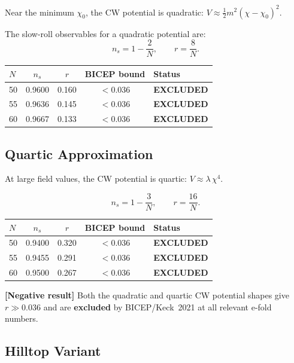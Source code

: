\documentclass[11pt,a4paper]{article}
\theoremstyle{plain}
\theoremstyle{definition}
\newcommand{\negresult}[1]{%
  \par\smallskip\noindent
  \colorbox{red!10}{\parbox{\dimexpr\linewidth-2\fboxsep}{%
    \textcolor{red!60!black}{\textbf{[Negative result]}} #1}}%
  \par\smallskip}
\begin{document}
Near the minimum $\chi_0$, the CW potential is quadratic:
$V \approx \frac{1}{2}m^2(\chi - \chi_0)^2$.

The slow-roll observables for a quadratic potential are:
\begin{equation}\label{eq:obs-quadratic}
  n_s = 1 - \frac{2}{N}, \qquad
  r = \frac{8}{N}.
\end{equation}

\begin{center}
\begin{tabular}{lcccl}
\toprule
$N$ & $n_s$ & $r$ & BICEP bound & Status \\
\midrule
50 & 0.9600 & 0.160 & $< 0.036$ & \textbf{EXCLUDED} \\
55 & 0.9636 & 0.145 & $< 0.036$ & \textbf{EXCLUDED} \\
60 & 0.9667 & 0.133 & $< 0.036$ & \textbf{EXCLUDED} \\
\bottomrule
\end{tabular}
\end{center}

\subsection{Quartic Approximation}

At large field values, the CW potential is quartic:
$V \approx \lambda\,\chi^4$.

\begin{equation}\label{eq:obs-quartic}
  n_s = 1 - \frac{3}{N}, \qquad
  r = \frac{16}{N}.
\end{equation}

\begin{center}
\begin{tabular}{lcccl}
\toprule
$N$ & $n_s$ & $r$ & BICEP bound & Status \\
\midrule
50 & 0.9400 & 0.320 & $< 0.036$ & \textbf{EXCLUDED} \\
55 & 0.9455 & 0.291 & $< 0.036$ & \textbf{EXCLUDED} \\
60 & 0.9500 & 0.267 & $< 0.036$ & \textbf{EXCLUDED} \\
\bottomrule
\end{tabular}
\end{center}

\negresult{Both the quadratic and quartic CW potential shapes give
$r \gg 0.036$ and are \textbf{excluded} by BICEP/Keck~2021
at all relevant e-fold numbers.}

\subsection{Hilltop Variant}
\end{document}
